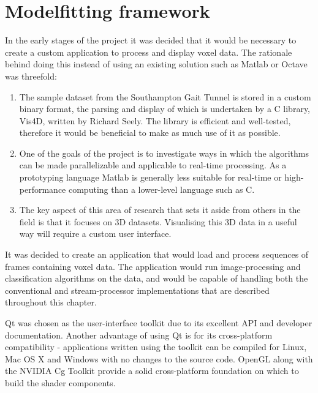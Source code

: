 \section{Modelfitting framework}

In the early stages of the project it was decided that it would be necessary to create a custom application to process and display voxel data.
The rationale behind doing this instead of using an existing solution such as Matlab or Octave was threefold:

\begin{enumerate}
	\item The sample dataset from the Southampton Gait Tunnel is stored in a custom binary format, the parsing and display of which is
		undertaken by a C library, Vis4D, written by Richard Seely.
		The library is efficient and well-tested, therefore it would be beneficial to make as much use of it as possible.
	\item One of the goals of the project is to investigate ways in which the algorithms can be made parallelizable and applicable to real-time processing.
		As a prototyping language Matlab is generally less suitable for real-time or high-performance computing than a lower-level language such as C.
	\item The key aspect of this area of research that sets it aside from others in the field is that it focuses on 3D datasets.
		Visualising this 3D data in a useful way will require a custom user interface.
\end{enumerate}

It was decided to create an application that would load and process sequences of frames containing voxel data.
The application would run image-processing and classification algorithms on the data, and would be capable of handling both
the conventional and stream-processor implementations that are described throughout this chapter.

Qt \cite{Qt} was chosen as the user-interface toolkit due to its excellent API and developer documentation.
Another advantage of using Qt is for its cross-platform compatibility - applications written using the toolkit can be compiled
for Linux, Mac OS X and Windows with no changes to the source code.
OpenGL along with the NVIDIA Cg Toolkit \cite{CgToolkit} provide a solid cross-platform foundation on which to build the shader components.

